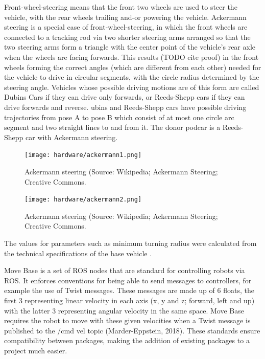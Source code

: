 \documentclass[a4paper]{article}
\begin{document}
Front-wheel-steering means that the front two wheels are used to steer the vehicle, with the rear wheels trailing and-or powering the vehicle. Ackermann steering is a special case of front-wheel-steering, in which the front wheels are connected to a tracking rod via two shorter steering arms arranged so that the two steering arms form a triangle with the center point of the vehicle’s rear axle when the wheels are facing forwards.  This results (TODO cite proof) in the front wheels forming the correct angles (which are different from each other) needed for the vehicle to drive in circular segments, with the circle radius determined by the steering angle.   Vehicles whose possible driving motions are of this form are called Dubins Cars if they can drive only forwards, or Reeds-Shepp cars if they can drive forwards and reverse. ubins and Reeds-Shepp cars have possible driving trajectories from pose A to pose B which consist of at most one circle arc segment and two straight lines to and from it. The donor podcar is a Reeds-Shepp car with Ackermann steering.

\begin{figure}[h]
	\texttt{[image: hardware/ackermann1.png]}
	\caption{Ackermann steering (Source: Wikipedia; Ackermann Steering; Creative Commons.}
	\label{fig:ackermann1}
\end{figure}

\begin{figure}[h]
	\texttt{[image: hardware/ackermann2.png]}
	\caption{Ackermann steering (Source: Wikipedia; Ackermann Steering; Creative Commons.}
	\label{fig:ackermann1}
\end{figure}

The values for parameters such as minimum turning radius were calculated from the technical specifications of the base vehicle \cite{shopriderflagship}.

Move Base is a set of ROS nodes that are standard for controlling robots via ROS. It enforces
conventions for being able to send messages to controllers, for example the use of Twist
messages. These messages are made up of 6 floats, the first 3 representing linear velocity in
each axis (x, y and z; forward, left and up) with the latter 3 representing angular velocity in
the same space. Move Base requires the robot to move with these given velocities when a
Twist message is published to the /cmd vel topic (Marder-Eppstein, 2018). These standards
ensure compatibility between packages, making the addition of existing packages to a project
much easier.
\end{document}
